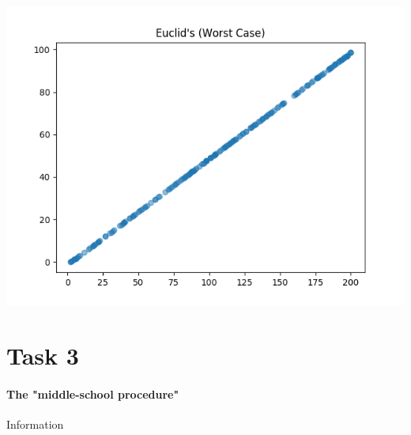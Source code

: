 \documentclass{report}
\begin{document}
\begin{flushleft}
		\includegraphics{task2}

		\section{Task 3}

		\paragraph{The "middle-school procedure"}
		Information

	\end{flushleft}
\end{document}
